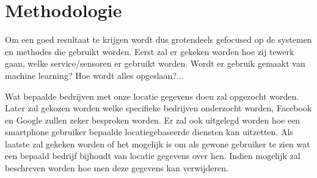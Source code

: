 
\chapter{Methodologie}
\label{ch:methodologie}


Om een goed resultaat te krijgen wordt dus grotendeels gefocused op de systemen en methodes die gebruikt worden. Eerst zal er gekeken worden hoe zij tewerk gaan, welke service/sensoren er gebruikt worden. Wordt er gebruik gemaakt van machine learning? Hoe wordt alles opgeslaan?...

Wat bepaalde bedrijven met onze locatie gegevens doen zal opgezocht worden. Later zal gekozen worden welke specifieke bedrijven onderzocht worden, Facebook en Google zullen zeker besproken worden.
Er zal ook uitgelegd worden hoe een smartphone gebruiker bepaalde locatiegebaseerde diensten kan uitzetten.
Als laatste zal gekeken worden of het mogelijk is om als gewone gebruiker te zien wat een bepaald bedrijf bijhoudt van locatie gegevens over hen. Indien mogelijk zal beschreven worden hoe men deze gegevens kan verwijderen.



